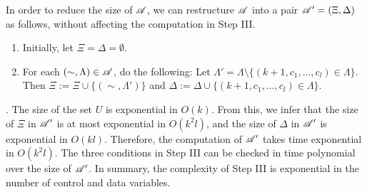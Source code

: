 In order to reduce the size of $\mathscr{A}$, we can restructure $\mathscr{A}$ into a pair $\mathscr{A}'=(\Xi, \Delta)$ as follows, without affecting the computation in Step III.
\begin{enumerate}
\item Initially, let $\Xi = \Delta = \emptyset$.
\item For each $(\sim, \Lambda) \in \mathscr{A}$, do the following: Let $\Lambda' = \Lambda \setminus \{(k+1, c_1, \dots, c_l) \in \Lambda\}$. Then $\Xi := \Xi \cup \{(\sim, \Lambda')\}$ and $\Delta:= \Delta \cup \{(k+1,c_1,\dots, c_l) \in \Lambda\}$. 
\end{enumerate}

. The size of the set $U$ is exponential in $O(k)$. From this, we infer that the size of $\Xi$ in $\mathscr{A}'$ is at most exponential in $O(k^2l)$, and the size of $\Delta$ in $\mathscr{A}'$ is exponential in $O(kl)$. Therefore, the computation of $\mathscr{A}'$ takes time exponential in $O(k^2l)$. The three conditions in Step III can be checked in time polynomial over the size of $\mathscr{A}'$. In summary, the complexity of Step III is exponential in the number of control and data variables.

